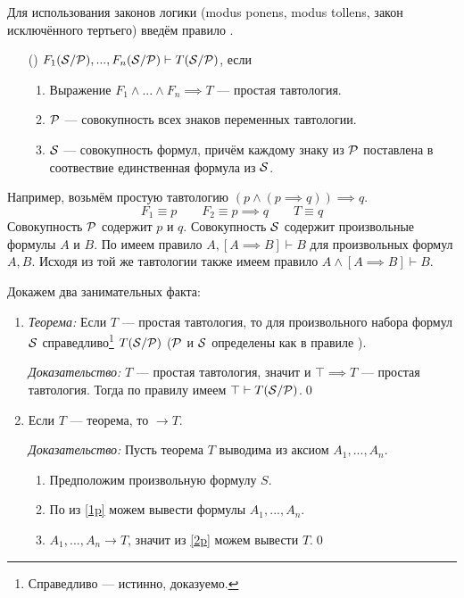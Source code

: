 Для использования законов логики (modus ponens, modus tollens, закон
исключённого тертьего) введём правило \taut{}.
\begin{enumerate}
  \item[(\taut)]{}$F_1(\mathcal S/\mathcal P),...,F_n(\mathcal S/\mathcal P)\vdash T(\mathcal S/\mathcal P)$, если
  \begin{enumerate}
    \item{}Выражение ${F_1\land...\land F_n\implies T}$ --- простая тавтология.
    \item{}$\mathcal P$ --- совокупность всех знаков переменных тавтологии.
    \item{}$\mathcal S$ --- совокупность формул, причём каждому знаку из $\mathcal P$
    поставлена в соотвествие единственная формула из $\mathcal S$.
  \end{enumerate}
\end{enumerate}

Например, возьмём простую тавтологию $(p\land (p\implies q))\implies q$.
\[
  F_1\equiv p\qquad F_2\equiv p\implies q\qquad T\equiv q
\]
Совокупность $\mathcal P$ содержит $p$ и $q$.
Совокупность $\mathcal S$ содержит произвольные формулы $A$ и $B$.
По \taut{} имеем правило ${A,[A\implies B]\vdash B}$
для произвольных формул $A,B$.
Исходя из той же тавтологии также имеем правило ${A\land[A\implies B]\vdash B}$.

Докажем два занимательных факта:
\begin{enumerate}
  \item{}
        {\it Теорема:}
  Если $T$ --- простая тавтология, то
  для произвольного набора формул $\mathcal S$ справедливо\footnote{
    Справедливо --- истинно, доказуемо.
  } $T(\mathcal S/\mathcal P)$
  ($\mathcal P$ и $\mathcal S$ определены как в правиле \taut{}).

    {\it Доказательство:}
  $T$ --- простая тавтология, значит и
  ${\top\implies T}$ --- простая тавтология. Тогда по правилу \taut{} имеем
  $\top\vdash T(\mathcal S/\mathcal P)$.\qed

  \item{}Если $T$ --- теорема, то $\to T$.

    {\it Доказательство:}
  Пусть теорема $T$ выводима из аксиом $A_1,...,A_{n}$.
  \begin{enumerate}[label=(\roman*)]
    \item{}\label{1p}Предположим произвольную формулу $S$.
    \item{}\label{2p}По \axiom{} из \ref{1p} можем вывести
    формулы $A_1,...,A_{n}$.
    \item{}\label{3p}$A_1,...,A_{n}\to T$, значит из \ref{2p} можем вывести $T$.\qed
  \end{enumerate}
\end{enumerate}

